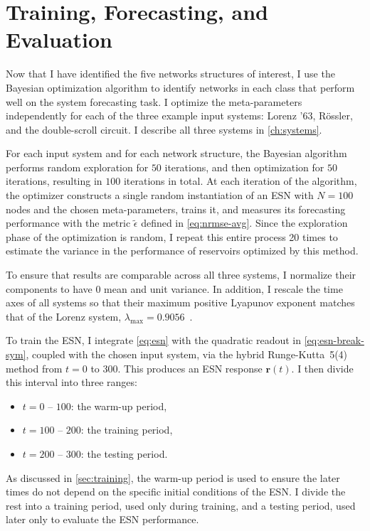 \section{Training, Forecasting, and Evaluation}

Now that I have identified the five networks structures of interest, I
use the Bayesian optimization algorithm to identify networks in each
class that perform well on the system forecasting task. I optimize the
meta-parameters independently for each of the three example input
systems: Lorenz '63, R{\"{o}}ssler, and the double-scroll circuit. I
describe all three systems in \cref{ch:systems}.

For each input system and for each network structure, the Bayesian
algorithm performs random exploration for $50$ iterations, and then
optimization for $50$ iterations, resulting in $100$ iterations in
total. At each iteration of the algorithm, the optimizer constructs a
single random instantiation of an ESN with $N=100$ nodes and the chosen meta-parameters,
trains it, and measures its forecasting performance with the metric
$\tilde{\epsilon}$ defined in \cref{eq:nrmse-avg}. Since the
exploration phase of the optimization is random, I repeat this entire
process 20 times to estimate the variance in the performance of
reservoirs optimized by this method.

To ensure that results are comparable across all three systems, I
normalize their components to have $0$ mean and unit variance. In
addition, I rescale the time axes of all systems so that their maximum
positive Lyapunov exponent matches that of the Lorenz system,
$\lambda_\text{max} = 0.9056$~\cite{viswanath1998}.

To train the ESN, I integrate \cref{eq:esn} with the quadratic readout
in \cref{eq:esn-break-sym}, coupled with the chosen input system, via
the hybrid Runge-Kutta~5(4)~\cite{dormand1980} method from $t = 0$ to
$300$. This produces an ESN response $\bm{r}(t)$. I then divide this interval into three ranges:
\begin{itemize}
\item $t = 0$ -- $100$: the warm-up period,
\item $t = 100$ -- $200$: the training period,
\item $t = 200$ -- $300$: the testing period.
\end{itemize}
As discussed in \cref{sec:training}, the warm-up period is used to
ensure the later times do not depend on the specific initial
conditions of the ESN. I divide the rest into a training period, used
only during training, and a testing period, used later only to
evaluate the ESN performance.

